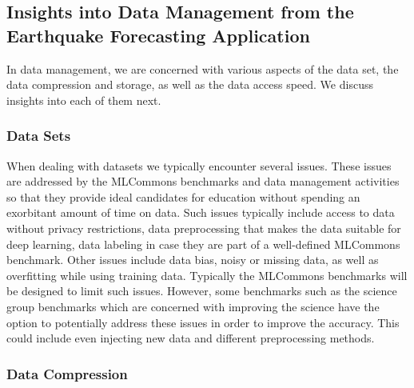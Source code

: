 \documentclass[utf8]{FrontiersinVancouver} %
\begin{document}


\subsection{Insights into Data Management from the Earthquake Forecasting Application}
\label{sec:eq-data}

In data management, we are concerned with various aspects of the data set, the data compression and storage, as well as the data access speed. We discuss insights into each of them next.

\subsubsection{Data Sets}


When dealing with datasets we typically encounter several issues.  These issues are addressed by the MLCommons benchmarks and data management activities so that they provide ideal candidates for education without spending an exorbitant amount of time on data. Such issues typically include access to data without privacy restrictions, data preprocessing that makes the data suitable for deep learning, data labeling in case they are part of a well-defined MLCommons benchmark. Other issues include data bias, noisy or missing data, as well as overfitting while using training data. Typically the MLCommons benchmarks will be designed to limit such issues. However, some benchmarks such as the science group benchmarks which are concerned with improving the science have the option to potentially address these issues in order to improve the accuracy. This could include even injecting new data and different preprocessing methods.


\subsubsection{Data Compression}
\end{document}
